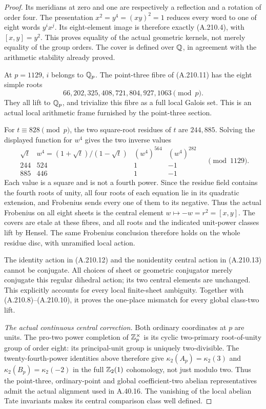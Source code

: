 \begin{proof}
Its meridians at zero and one are respectively a
reflection and a rotation of order four.  The presentation
\(x^2=y^4=(xy)^2=1\) reduces every word to one of
eight words \(y^i x^j\).  Its eight-element image is
therefore exactly (A.210.4), with \([x,y]=y^2\).
This proves equality of the actual geometric kernels,
not merely equality of the group orders.  The cover
is defined over \(\mathbb Q\), in agreement with the
arithmetic stability already proved.

At \(p=1129\), \(i\) belongs to \(\mathbb Q_p\).
The point-three fibre of (A.210.11) has the eight
simple roots
\[
                 66,202,325,408,721,804,927,1063
                                      \pmod p.
\tag{A.210.12}
\]
They all lift to \(\mathbb Q_p\), and trivialize this fibre
as a full local Galois set.  This is an actual local
arithmetic frame furnished by the point-three section.

For \(t\equiv828\pmod p\), the two square-root residues
of \(t\) are \(244,885\).  Solving the displayed
function for \(w^4\) gives the two inverse values
\[
 \begin{array}{c|c|c|c}
 \sqrt t&w^4=(1+\sqrt t)/(1-\sqrt t)
          &(w^4)^{564}&(w^4)^{282}\\\hline
 244&524&1&-1\\
 885&446&1&-1
 \end{array}\quad\pmod {1129}.
\tag{A.210.13}
\]
Each value is a square and is not a fourth power.
Since the residue field contains the fourth roots of
unity, all four roots of each equation lie in its
quadratic extension, and Frobenius sends every one
of them to its negative.  Thus the actual Frobenius
on all eight sheets is the central element
\(w\mapsto-w=r^2=[x,y]\).
The covers are etale at these fibres, and all roots
and the indicated unit-power classes lift by Hensel.
The same Frobenius conclusion therefore holds on the
whole residue disc, with unramified local action.

The identity action in (A.210.12) and the nonidentity
central action in (A.210.13) cannot be conjugate.
All choices of sheet or geometric conjugator merely
conjugate this regular dihedral action; its two
central elements are unchanged.  This explicitly
accounts for every local finite-sheet ambiguity.
Together with (A.210.8)--(A.210.10), it proves the
one-place mismatch for every global class-two lift.

\emph{The actual continuous central correction.}
Both ordinary coordinates at \(p\) are units.
The pro-two power completion of \(\mathbb Z_p^\times\)
is its cyclic two-primary root-of-unity group of
order eight: its principal-unit group is uniquely
two-divisible.  The twenty-fourth-power identities
above therefore give
\(\kappa_2(A_p)=\kappa_2(3)\) and
\(\kappa_2(B_p)=\kappa_2(-2)\) in the full
\(\mathbb Z_2(1)\) cohomology, not just modulo two.
Thus the point-three, ordinary-point and global
coefficient-two abelian representatives admit the
actual alignment used in A.40.16.
The vanishing of the local abelian Tate invariants
makes its central comparison class well defined.


\end{proof}

